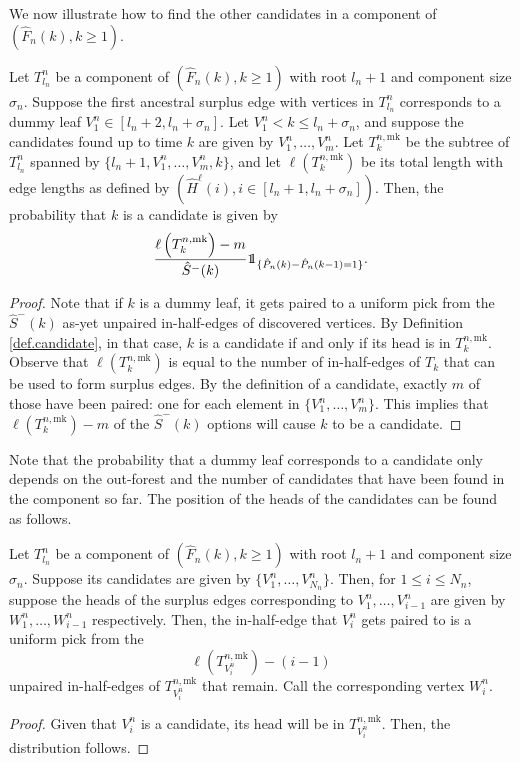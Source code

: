 We now illustrate how to find the other candidates in a component of $(\hat{F}_n(k),k\geq 1)$. 
\begin{lemma}\label{lemma.samplecandidates}
Let $T^n_{l_n}$ be a component of $(\hat{F}_n(k),k\geq 1)$ with root $l_n+1$ and component size $\sigma_n$. Suppose the first ancestral surplus edge with vertices in $T^n_{l_n}$ corresponds to a dummy leaf $V^n_1\in [l_n+2,l_n+\sigma_n]$. Let $V^n_1<k\leq l_n+\sigma_n$, and suppose the candidates found up to time $k$ are given by $V^n_1,\dots,V^n_m$. Let $T^{n,\mathrm{mk}}_k$ be the subtree of $T^n_{l_n}$ spanned by $\{l_n+1,V^n_1,\dots,V^n_m,k\}$, and let $\ell(T^{n,\mathrm{mk}}_k)$ be its total length with edge lengths as defined by $(\hat{H}^\ell(i),i\in [l_n+1,l_n+\sigma_n])$. Then, the probability that $k$ is a candidate is given by 
$$\frac{\ell\left(T^{n,\mathrm{mk}}_k\right)-m}{\hat{S}^-(k)}\one_{\{\hat{P}_n(k)-\hat{P}_n(k-1)=1\}}.$$
\end{lemma}
\begin{proof}
Note that if $k$ is a dummy leaf, it gets paired to a uniform pick from the $\hat{S}^-(k)$ as-yet unpaired in-half-edges of discovered vertices. By Definition \ref{def.candidate}, in that case, $k$ is a candidate if and only if its head is in $T^{n,\mathrm{mk}}_k$. Observe that $\ell\left(T^{n,\mathrm{mk}}_k\right)$ is equal to the number of in-half-edges of $T_{k}$ that can be used to form surplus edges. By the definition of a candidate, exactly $m$ of those have been paired: one for each element in $\{V^n_1,\dots,V^n_m\}$. This implies that $\ell\left(T^{n,\mathrm{mk}}_k\right)-m$ of the $\hat{S}^-(k)$ options will cause $k$ to be a candidate.
\end{proof}

Note that the probability that a dummy leaf corresponds to a candidate only depends on the out-forest and the number of candidates that have been found in the component so far. The position of the heads of the candidates can be found as follows.
\begin{lemma}\label{lemma.sampleheadcandidates}
Let $T^n_{l_n}$ be a component of $(\hat{F}_n(k),k\geq 1)$ with root $l_n+1$ and component size $\sigma_n$. Suppose its candidates are given by $\{V^n_1,\dots,V^n_{N_n}\}$. Then, for $1\leq i\leq {N_n}$, suppose the heads of the surplus edges corresponding to $V^n_1,\dots,V^n_{i-1}$ are given by $W_1^n,\dots,W^n_{i-1}$ respectively. Then, the in-half-edge that $V^n_{i}$ gets paired to is a uniform pick from the $$\ell\left(T^{n,\mathrm{mk}}_{V^n_i}\right)-(i-1)$$ unpaired in-half-edges of $T^{n,\mathrm{mk}}_{V^n_i}$ that remain. Call the corresponding vertex $W^n_i$.
\end{lemma}
\begin{proof}
Given that $V^n_{i}$ is a candidate, its head will be in $T^{n,\mathrm{mk}}_{V^n_i}$. Then, the distribution follows.
\end{proof}

